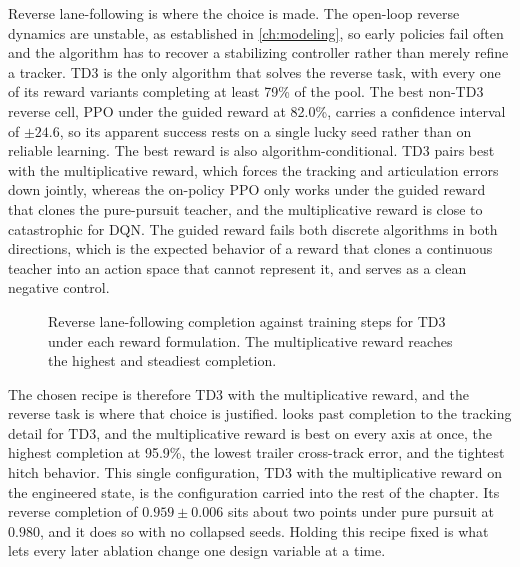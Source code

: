 Reverse lane-following is where the choice is made. The open-loop reverse dynamics are unstable, as established in \cref{ch:modeling}, so early policies fail often and the algorithm has to recover a stabilizing controller rather than merely refine a tracker. TD3 is the only algorithm that solves the reverse task, with every one of its reward variants completing at least 79\% of the pool. The best non-TD3 reverse cell, PPO under the guided reward at 82.0\%, carries a confidence interval of $\pm 24.6$, so its apparent success rests on a single lucky seed rather than on reliable learning. The best reward is also algorithm-conditional. TD3 pairs best with the multiplicative reward, which forces the tracking and articulation errors down jointly, whereas the on-policy PPO only works under the guided reward that clones the pure-pursuit teacher, and the multiplicative reward is close to catastrophic for DQN. The guided reward fails both discrete algorithms in both directions, which is the expected behavior of a reward that clones a continuous teacher into an action space that cannot represent it, and serves as a clean negative control.

\begin{figure}[H]
    \centering
    \caption{Reverse lane-following completion against training steps for TD3 under each reward formulation. The multiplicative reward reaches the highest and steadiest completion.}
    \label{fig:reverse_reward_ablation}
\end{figure}

The chosen recipe is therefore TD3 with the multiplicative reward, and the reverse task is where that choice is justified.  looks past completion to the tracking detail for TD3, and the multiplicative reward is best on every axis at once, the highest completion at 95.9\%, the lowest trailer cross-track error, and the tightest hitch behavior. This single configuration, TD3 with the multiplicative reward on the engineered state, is the configuration carried into the rest of the chapter. Its reverse completion of $0.959 \pm 0.006$ sits about two points under pure pursuit at $0.980$, and it does so with no collapsed seeds. Holding this recipe fixed is what lets every later ablation change one design variable at a time.



